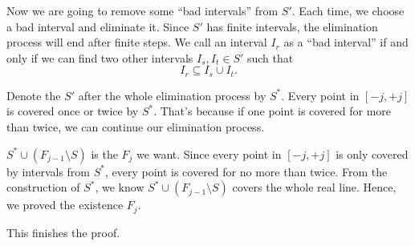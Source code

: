     Now we are going to remove some ``bad intervals'' from $S'$. Each time, we choose a bad interval and eliminate it. Since $S'$ has finite intervals, the elimination process will end after finite steps. We call an interval $I_r$ as a ``bad interval'' if and only if we can find two other intervals $I_s, I_t \in S'$ such that \[
        I_r \subseteq I_s \cup I_t.
    \] 
    
    Denote the $S'$ after the whole elimination process by $S^*$. Every point in $[-j, +j]$ is covered once or twice by $S^*$. That's because if one point is covered for more than twice, we can continue our elimination process.

    $S^* \cup (F_{j-1} \setminus S)$ is the $F_j$ we want. Since every point in $[-j, +j]$ is only covered by intervals from $S^*$, every point is covered for no more than twice. From the construction of $S^*$, we know $S^* \cup (F_{j-1} \setminus S)$ covers the whole real line. Hence, we proved the existence $F_j$.

    This finishes the proof.

